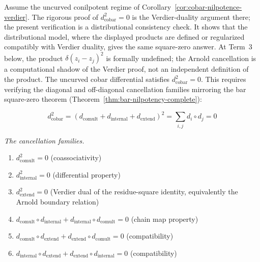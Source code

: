 \begin{theorem}[Uncurved distributional verification of
\texorpdfstring{$d_{\text{cobar}}^2 = 0$}{d\_cobar\textasciicircum 2 = 0};
\ClaimStatusProvedHere]\label{thm:cobar-d-squared-zero}
Assume the uncurved conilpotent regime of
Corollary~\ref{cor:cobar-nilpotence-verdier}. The rigorous proof of
$d_{\mathrm{cobar}}^2 = 0$ is the Verdier-duality argument there; the
present verification is a distributional consistency check. It shows
that the distributional model, where the displayed products are defined
or regularized compatibly with Verdier duality, gives the same
square-zero answer. At Term~3 below, the product
$\delta(z_i - z_j)^2$ is formally undefined; the Arnold cancellation is
a computational shadow of the Verdier proof, not an independent
definition of the product.
The uncurved cobar differential satisfies $d_{\text{cobar}}^2 = 0$.
This requires verifying the diagonal and off-diagonal cancellation
  families mirroring the bar square-zero theorem
  (Theorem~\ref{thm:bar-nilpotency-complete}):

\[d_{\text{cobar}}^2 = (d_{\text{comult}} + d_{\text{internal}} + d_{\text{extend}})^2
= \sum_{i,j} d_i \circ d_j = 0\]

\emph{The cancellation families.}
\begin{enumerate}
\item $d_{\text{comult}}^2 = 0$ (coassociativity)
\item $d_{\text{internal}}^2 = 0$ (differential property)
\item $d_{\text{extend}}^2 = 0$ (Verdier dual of the residue-square
identity, equivalently the Arnold boundary relation)
\item $d_{\text{comult}} \circ d_{\text{internal}} + d_{\text{internal}} \circ
d_{\text{comult}} = 0$ (chain map property)
\item $d_{\text{comult}} \circ d_{\text{extend}} + d_{\text{extend}} \circ
d_{\text{comult}} = 0$ (compatibility)
\item $d_{\text{internal}} \circ d_{\text{extend}} + d_{\text{extend}} \circ
d_{\text{internal}} = 0$ (compatibility)
\end{enumerate}
\end{theorem}

